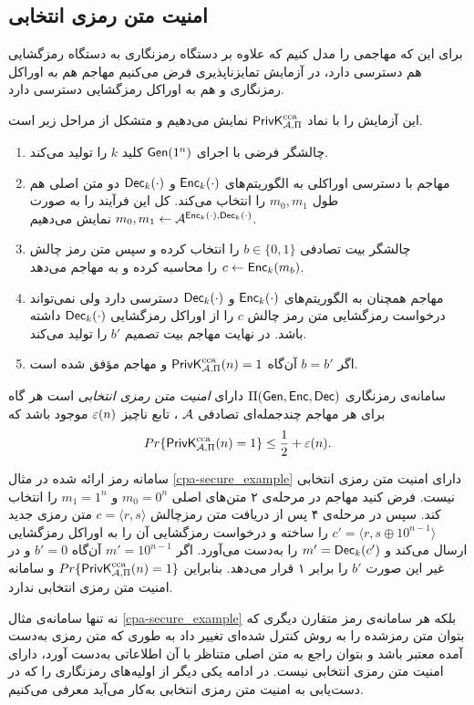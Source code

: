 \subsection*{امنیت متن رمزی انتخابی}
برای این که مهاجمی را مدل کنیم که علاوه بر دستگاه رمزنگاری به دستگاه رمزگشایی هم دسترسی دارد، در آزمایش تمایزناپذیری فرض می‌کنیم مهاجم هم به اوراکل رمزنگاری و هم به اوراکل رمزگشایی دسترسی دارد.
\begin{definition}\cite{katz2014introduction}
این آزمایش را با نماد
$\mathsf{PrivK}_{\mathcal{A},\Pi}^{\textup{cca}}$
نمایش می‌دهیم و متشکل از مراحل زیر است.
\begin{enumerate}
\item
چالشگر فرضی با اجرای 
$\mathsf{Gen}(1^{n})$
کلید 
$k$
را تولید می‌کند.
\item
مهاجم با دسترسی اوراکلی به الگوریتم‌های 
$\mathsf{Enc}_{k}(\cdot)$
و
$\mathsf{Dec}_{k}(\cdot)$
دو متن اصلی هم طول 
$m_{0}, m_{1}$
را انتخاب می‌کند. کل این فرآیند را به صورت 
$m_{0}, m_{1}\leftarrow\mathcal{A}^{\mathsf{Enc}_{k}(\cdot), \mathsf{Dec}_{k}(\cdot)}$
		نمایش می‌دهیم.
\item 
چالشگر بیت تصادفی 
$b\in\{0, 1\}$
را انتخاب کرده و سپس متن رمز چالش 
$c\leftarrow \mathsf{Enc}_{k}(m_{b})$
را محاسبه کرده و به مهاجم می‌دهد.
\item
مهاجم همچنان به الگوریتم‌های
$\mathsf{Enc}_{k}(\cdot)$
و
$\mathsf{Dec}_{k}(\cdot)$
دسترسی دارد ولی نمی‌تواند درخواست رمزگشایی متن رمز چالش 
$c$
را از اوراکل رمزگشایی 
$\mathsf{Dec}_{k}(\cdot)$
 داشته باشد. در نهایت مهاجم بیت تصمیم
 $b'$
 را تولید می‌کند.
 \item
 اگر 
 $b = b'$
  آن‌گاه 
  $\mathsf{PrivK}_{\mathcal{A},\Pi}^{\textup{cca}}(n) = 1$
  و مهاجم مؤفق شده است.
\end{enumerate}
\end{definition}
\begin{definition}
سامانه‌ی رمزنگاری 
$\Pi(\mathsf{Gen}, \mathsf{Enc}, \mathsf{Dec})$
 دارای 
\textit{ امنیت متن رمزی انتخابی }
 است هر گاه برای هر مهاجم چندجمله‌ای تصادفی 
 $\mathcal{A}$
 ، تابع ناچیز 
 $\varepsilon(n)$
 موجود باشد که
 $$Pr\{\mathsf{PrivK}_{\mathcal{A},\Pi}^{\textup{cca}}(n) = 1\}\leq \frac{1}{2} + \varepsilon(n).$$

\end{definition}
\begin{example}
سامانه رمز ارائه شده در مثال 
\ref{cpa-secure_example}
دارای امنیت متن رمزی انتخابی نیست. فرض کنید مهاجم در مرحله‌ی ۲ متن‌های اصلی 
$m_{0} = 0^{n}$
و 
$m_{1} = 1^{n}$
را انتخاب کند. سپس در مرحله‌ی ۴ پس از دریافت متن رمزچالش 
$c = \langle r, s\rangle$
متن رمزی جدید 
$c' = \langle r, s\oplus 10^{n-1}\rangle$
را ساخته و درخواست رمزگشایی آن را به اوراکل رمزگشایی ارسال می‌کند و 
$m' = \mathsf{Dec}_{k}(c')$
را به‌دست  می‌آورد. اگر 
$m' = 10^{n-1}$
آن‌گاه  
$b' = 0$
و در غیر این صورت 
$b'$
را برابر ۱ قرار می‌دهد. بنابراین 
$Pr\{\mathsf{PrivK}_{\mathcal{A},\Pi}^{\textup{cca}}(n) = 1\}$
و سامانه امنیت متن رمزی انتخابی ندارد.
\end{example}
 نه تنها سامانه‌ی مثال 
\ref{cpa-secure_example}
بلکه  هر سامانه‌ی رمز متقارن دیگری که بتوان متن رمزشده را به روش کنترل شده‌ای تغییر داد به طوری که متن رمزی به‌دست  آمده معتبر باشد و بتوان راجع به متن اصلی متناظر با آن اطلاعاتی به‌دست  آورد، دارای امنیت متن رمزی انتخابی نیست. در ادامه یکی دیگر از اولیه‌های 
رمزنگاری را که در دست‌یابی به امنیت متن رمزی انتخابی به‌کار می‌آید معرفی می‌کنیم.

